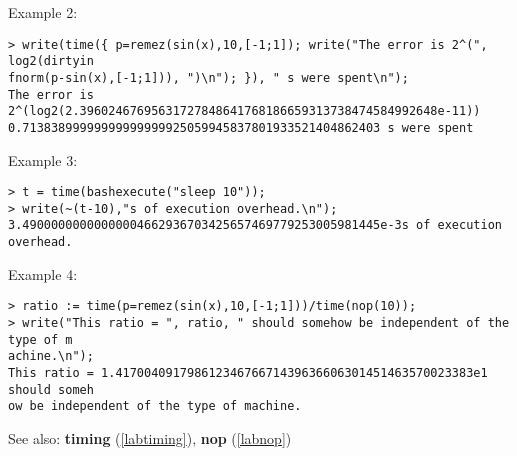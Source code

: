 \noindent Example 2: 
\begin{center}\begin{minipage}{15cm}\begin{Verbatim}[frame=single]
> write(time({ p=remez(sin(x),10,[-1;1]); write("The error is 2^(", log2(dirtyin
fnorm(p-sin(x),[-1;1])), ")\n"); }), " s were spent\n");
The error is 2^(log2(2.39602467695631727848641768186659313738474584992648e-11))
0.71383899999999999999925059945837801933521404862403 s were spent
\end{Verbatim}
\end{minipage}\end{center}
\noindent Example 3: 
\begin{center}\begin{minipage}{15cm}\begin{Verbatim}[frame=single]
> t = time(bashexecute("sleep 10"));
> write(~(t-10),"s of execution overhead.\n");
3.49000000000000004662936703425657469779253005981445e-3s of execution overhead.
\end{Verbatim}
\end{minipage}\end{center}
\noindent Example 4: 
\begin{center}\begin{minipage}{15cm}\begin{Verbatim}[frame=single]
> ratio := time(p=remez(sin(x),10,[-1;1]))/time(nop(10));
> write("This ratio = ", ratio, " should somehow be independent of the type of m
achine.\n");
This ratio = 1.41700409179861234676671439636606301451463570023383e1 should someh
ow be independent of the type of machine.
\end{Verbatim}
\end{minipage}\end{center}
See also: \textbf{timing} (\ref{labtiming}), \textbf{nop} (\ref{labnop})
